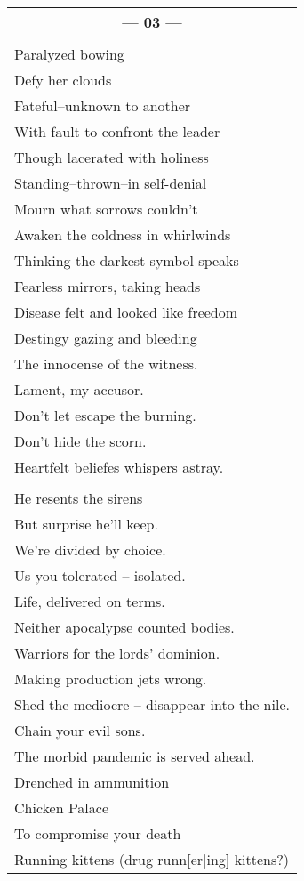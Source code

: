 \documentclass{article}
\begin{document}
\begin{center}
\begin{tabular}{l}
\multicolumn{1}{c}{\textbf{--- 03 ---}} \\ \hline
\\
Paralyzed bowing \\
Defy her clouds \\
Fateful--unknown to another \\
With fault to confront the leader \\
Though lacerated with holiness \\
Standing--thrown--in self-denial \\
Mourn what sorrows couldn't \\
Awaken the coldness in whirlwinds \\
Thinking the darkest symbol speaks \\
Fearless mirrors, taking heads \\
Disease felt and looked like freedom \\
Destingy gazing and bleeding \\
The innocense of the witness. \\
Lament, my accusor. \\
Don't let escape the burning. \\
Don't hide the scorn. \\
Heartfelt beliefes whispers astray. \\
\\
He resents the sirens \\
But surprise he'll keep. \\
We're divided by choice. \\
Us you tolerated -- isolated. \\
Life, delivered on terms. \\
Neither apocalypse counted bodies. \\
Warriors for the lords' dominion. \\
Making production jets wrong. \\
Shed the mediocre -- disappear into the nile. \\
Chain your evil sons. \\
The morbid pandemic is served ahead. \\
Drenched in ammunition \\
Chicken Palace \\
To compromise your death \\
Running kittens (drug runn[er|ing] kittens?) \\
\end{tabular}

\end{center}
\end{document}
